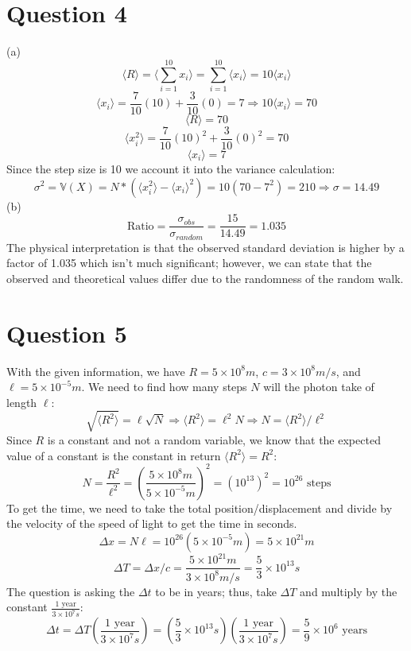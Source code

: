 \documentclass[11pt]{article}
\def\l{\ell}
\def\la{\langle}
\def\ra{\rangle}
\theoremstyle{pink}
\theoremstyle{boxedsolution}
\theoremstyle{definition}
\theoremstyle{claim}
\begin{document}
 \section*{Question 4}
 (a) 
 \[\la R \ra=\la\sum^{10}_{i=1} x_i\ra = \sum^{10}_{i=1}\la x_i\ra = 10\la x_i\ra\]
 \vspace{3mm}
 \[\la x_i\ra=\frac{7}{10}(10)+\frac{3}{10}(0)=7 \Rightarrow 10\la x_i\ra = 70\]
 \vspace{2mm}
 \[\la R\ra=70\]
 \vspace{5mm}
 \[\la x_i^2\ra=\frac{7}{10}(10)^2+\frac{3}{10}(0)^2=70\]
 \vspace{2mm}
 \[\la x_i\ra=7\]
  Since the step size is 10 we account it into the variance calculation:
  \[\sigma^2 = \mathbb{V}(X) = N*\left(\la x_i^2\ra - \la x_i\ra^2\right) = 10(70 - 7^2) = 210 \Rightarrow \sigma = 14.49\]
  (b)
  \[\text{Ratio}= \frac{\sigma_{obs}}{\sigma_{random}}=\frac{15}{14.49}=1.035\]
  The physical interpretation is that the observed standard deviation is higher by a factor of 1.035 which isn't much significant; however, we can state that the observed and theoretical values differ due to the randomness of the random walk.

 \newpage
 \section*{Question 5}
 With the given information, we have $R = 5 \times 10^{8}m$, $c = 3 \times 10^8 m/s$, and $\l = 5 \times 10^{-5}m$. We need to find how many steps $N$ will the photon take of length $\l$:
 \[\sqrt{\langle R^2 \rangle} = \l \sqrt{N} \Rightarrow \langle R^2 \rangle = \l^2 N \Rightarrow N = \langle R^2 \rangle/\l^2\]
 Since $R$ is a constant and not a random variable, we know that the expected value of a constant is the constant in return $\langle R^2 \rangle = R^2$:
 \[N=\frac{R^2}{\l^2}=\left(\frac{ 5 \times 10^{8}m}{5 \times 10^{-5}m}\right)^2=(10^{13})^2=10^{26} \text{ steps}\]
 To get the time, we need to take the total position/displacement and divide by the velocity of the speed of light to get the time in seconds. 
 \[\Delta x = N\l = 10^{26}(5\times 10^{-5} m)= 5\times 10^{21} m\]
 \[\Delta T = \Delta x/c = \frac{5\times 10^{21} m}{3 \times 10^8 m/s}=\frac{5}{3}\times 10^{13}s\]
 The question is asking the $\Delta t$ to be in years; thus, take $\Delta T$ and multiply by the constant $\frac{1 \text{ year}}{3\times10^7 s}$:
 \[\Delta t = \Delta T \left(\frac{1 \text{ year}}{3\times10^7 s}\right) = \left(\frac{5}{3}\times 10^{13}s\right) \left(\frac{1 \text{ year}}{3\times10^7 s}\right)=\frac{5}{9} \times 10^6 \text{ years}\]
 
\end{document}
